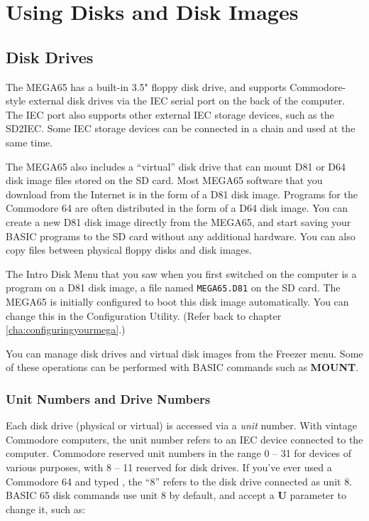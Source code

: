 \chapter{Using Disks and Disk Images}

\section{Disk Drives}
\label{cha:using-disks}

The MEGA65 has a built-in 3.5" floppy disk drive, and supports Commodore-style external disk drives via the IEC serial port on the back of the computer. The IEC port also supports other external IEC storage devices, such as the SD2IEC. Some IEC storage devices can be connected in a chain and used at the same time.

The MEGA65 also includes a ``virtual'' disk drive that can mount D81 or D64 disk image files stored on the SD card. Most MEGA65 software that you download from the Internet is in the form of a D81 disk image. Programs for the Commodore 64 are often distributed in the form of a D64 disk image. You can create a new D81 disk image directly from the MEGA65, and start saving your BASIC programs to the SD card without any additional hardware. You can also copy files between physical floppy disks and disk images.

The Intro Disk Menu that you saw when you first switched on the computer is a program on a D81 disk image, a file named {\tt MEGA65.D81} on the SD card. The MEGA65 is initially configured to boot this disk image automatically. You can change this in the Configuration Utility. (Refer back to chapter \vref{cha:configuringyourmega}.)

You can manage disk drives and virtual disk images from the Freezer menu. Some of these operations can be performed with BASIC commands such as {\bf MOUNT}.

\subsection{Unit Numbers and Drive Numbers}

Each disk drive (physical or virtual) is accessed via a {\it unit} number. With vintage Commodore computers, the unit number refers to an IEC device connected to the computer. Commodore reserved unit numbers in the range 0 -- 31 for devices of various purposes, with 8 -- 11 reserved for disk drives. If you've ever used a Commodore 64 and typed , the ``8'' refers to the disk drive connected as unit 8. BASIC 65 disk commands use unit 8 by default, and accept a {\bf U} parameter to change it, such as: 

